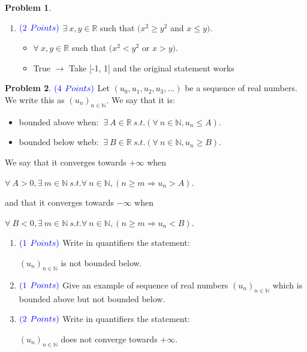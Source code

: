 \documentclass[letterpaper, 12pt]{article}
\theoremstyle{definition}
\newtheorem{pb}{Problem} %
\begin{document}
\begin{spacing}{1.33}
\begin{pb}
\begin{enumerate}
        \item[6.] $\color{blue}{(2}$ $\color{blue}{Points)}$ $\exists \: x, y \in \mathbb{R}$ such that $(x^2 \geq y^2$ and $x \leq y)$.
        \begin{itemize}
            \item $\forall \: x, y \in \mathbb{R}$ such that $(x^2 < y^2$ or $x > y)$.
            \item True $\longrightarrow$ Take [-1, 1] and the original statement works
        \end{itemize}
    \end{enumerate}
\end{pb}




\vspace{10cm}
\begin{pb}
    $\color{blue}{(4}$ $\color{blue}{Points)}$ Let $(u_0, u_1, u_2, u_3, ... )$ be a sequence of real numbers. We write this as $(u_n)_{n \in \mathbb{N}}.$ We say that it is:
    \begin{itemize}
        \item bounded above when: $\: \exists \: A \in \mathbb{R} \: s.t. ( \forall \: n \in \mathbb{N}, u_n \leq A).$
        \item bounded below wheb: $\: \exists \: B \in \mathbb{R} \: s.t. ( \forall \: n \in \mathbb{N}, u_n \geq B).$
    \end{itemize}
    We say that it converges towards $+\infty$ when
    \begin{center}
        $\forall \: A > 0, \exists \: m \in \mathbb{N} \: s.t. \forall \: n \in \mathbb{N}, (n \geq m \Longrightarrow u_n > A).$
    \end{center}
    and that it converges towards $-\infty$ when
    \begin{center}
        $\forall \: B < 0, \exists \: m \in \mathbb{N} \: s.t. \forall \: n \in \mathbb{N}, (n \geq m \Longrightarrow u_n < B).$
    \end{center}
    \begin{enumerate}
        \item [1.]$\color{blue}{(1}$ $\color{blue}{Points)}$ Write in quantifiers the statement:
        \begin{center}
            $(u_n)_{n \in \mathbb{N}}$ is not bounded below.
        \end{center}
        \item [2.]$\color{blue}{(1}$ $\color{blue}{Points)}$ Give an example of sequence of real numbers $(u_n)_{n \in \mathbb{N}}$ which is bounded above but not bounded below.
        \item [3.]$\color{blue}{(2}$ $\color{blue}{Points)}$ Write in quantifiers the statement:
        \begin{center}
            $(u_n)_{n \in \mathbb{N}}$ does not converge towards $+\infty$.
        \end{center}
    \end{enumerate}
\end{pb}



\end{spacing}
\end{document}
